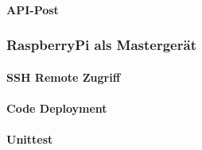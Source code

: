 \paragraph{API-Post}

\subsubsection{RaspberryPi als Mastergerät}
\paragraph{SSH Remote Zugriff}
\paragraph{Code Deployment}
\paragraph{Unittest}

\pagebreak


